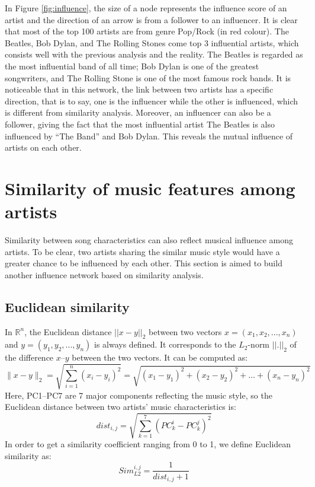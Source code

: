 In Figure \ref{fig:influence}, the size of a node represents the influence score of an artist and the direction of an arrow is from a follower to an influencer. It is clear that most of the top 100 artists are from genre Pop/Rock (in red colour). The Beatles, Bob Dylan, and The Rolling Stones come top 3 influential artists, which consists well with the previous analysis and the reality. The Beatles is regarded as the most influential band of all time; Bob Dylan is one of the greatest songwriters, and The Rolling Stone is one of the most famous rock bands. It is noticeable that in this network, the link between two artists has a specific direction, that is to say, one is the influencer while the other is influenced, which is different from similarity analysis. Moreover, an influencer can also be a follower, giving the fact that the most influential artist The Beatles is also influenced by ``The Band'' and Bob Dylan. This reveals the mutual influence of artists on each other.

\section{Similarity of music features among artists}

Similarity between song characteristics can also reflect musical influence among artists. To be clear, two artists sharing the similar music style would have a greater chance to be influenced by each other. This section is aimed to build another influence network based on similarity analysis.

\subsection{Euclidean similarity}

In $\mathbb{R}^n$, the Euclidean distance $||x-y||_2$ between two vectors $x = (x_1, x_2, ..., x_n)$ and $y = (y_1, y_2, ... , y_n)$ is always defined. It corresponds to the $L_2$-norm $||.||_2$ of the difference $x$--$y$ between the two vectors. It can be computed as:
\begin{equation}
\|x-y\|_{2}=\sqrt{\sum_{i=1}^{n}\left(x_{i}-y_{i}\right)^{2}}=\sqrt{\left(x_{1}-y_{1}\right)^{2}+\left(x_{2}-y_{2}\right)^{2}+\ldots+\left(x_{n}-y_{n}\right)^{2}}
\end{equation}
Here, PC1--PC7 are 7 major components reflecting the music style, so the Euclidean distance between two artists' music characteristics is:
\begin{equation}
dist_{i,j}=\sqrt{\sum_{k=1}^{7}\left(P C_{k}^{i}-P C_{k}^{j}\right)^{2}}
\end{equation}
In order to get a similarity coefficient ranging from 0 to 1, we define Euclidean similarity as:
\begin{equation}
Sim_{L2}^{i,j}=\frac{1}{dist_{i, j}+1}
\end{equation}

